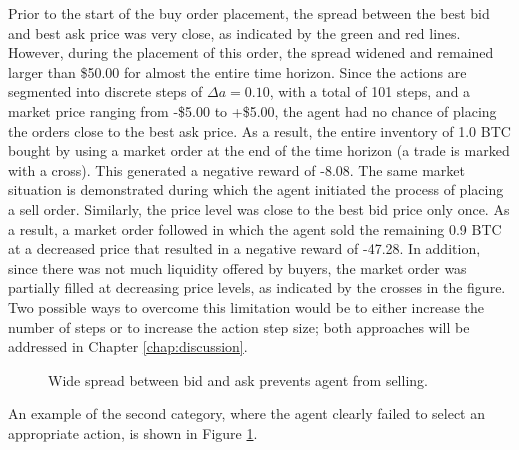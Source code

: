 Prior to the start of the buy order placement, the spread between the best bid and best ask price was very close, as indicated by the green and red lines.
However, during the placement of this order, the spread widened and remained larger than \$50.00 for almost the entire time horizon.
Since the actions are segmented into discrete steps of $\Delta{a}=0.10$, with a total of 101 steps, and a market price ranging from -\$5.00 to +\$5.00, the agent had no chance of placing the orders close to the best ask price.
As a result, the entire inventory of 1.0 BTC bought by using a market order at the end of the time horizon (a trade is marked with a cross).
This generated a negative reward of -8.08.
The same market situation is demonstrated during which the agent initiated the process of placing a sell order.
Similarly, the price level was close to the best bid price only once.
As a result, a market order followed in which the agent sold the remaining 0.9 BTC at a decreased price that resulted in a negative reward of -47.28.
In addition, since there was not much liquidity offered by buyers, the market order was partially filled at decreasing price levels, as indicated by the crosses in the figure.
Two possible ways to overcome this limitation would be to either increase the number of steps or to increase the action step size; both approaches will be addressed in Chapter \ref{chap:discussion}.
\begin{figure}[H]
    \centering
    \caption{Wide spread between bid and ask prevents agent from selling.}
    \label{fig:analysis-limit-impatient}
\end{figure}
An example of the second category, where the agent clearly failed to select an appropriate action, is shown in Figure \ref{fig:analysis-limit-impatient}.

